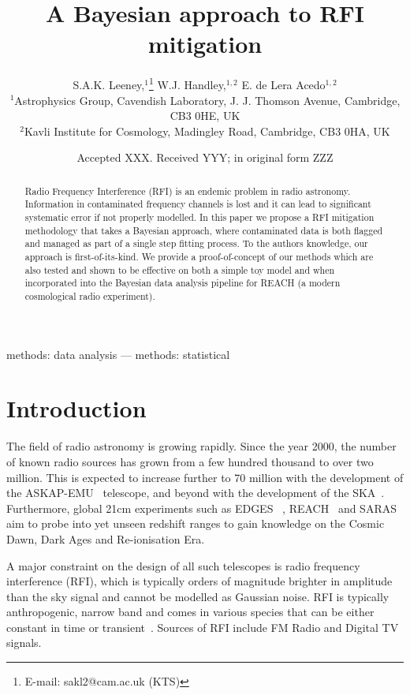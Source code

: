 \documentclass[fleqn,usenatbib]{mnras}
\title[Bayesian Approach to RFI Mitigation]{A Bayesian approach to RFI mitigation}
\author[S.A.K Leeney et al.]{
S.A.K. Leeney,$^{1}$\thanks{E-mail: sakl2@cam.ac.uk (KTS)}
W.J. Handley,$^{1, 2}$
E. de Lera Acedo$^{1, 2}$
\\
$^{1}$Astrophysics Group, Cavendish Laboratory, J. J. Thomson Avenue, Cambridge, CB3 0HE, UK\\
$^{2}$Kavli Institute for Cosmology, Madingley Road, Cambridge, CB3 0HA, UK\\
}
\date{Accepted XXX. Received YYY; in original form ZZZ}
\begin{document}
\label{firstpage}
\pagerange{\pageref{firstpage}--\pageref{lastpage}}
\maketitle

\begin{abstract}
Radio Frequency Interference (RFI) is an endemic problem in radio astronomy. Information in contaminated frequency channels is lost and it can lead to significant systematic error if not properly modelled. In this paper we propose a RFI mitigation methodology that takes a Bayesian approach, where contaminated data is both flagged and managed as part of a single step fitting process. To the authors knowledge, our approach is first-of-its-kind. We provide a proof-of-concept of our methods which are also tested and shown to be effective on both a simple toy model and when incorporated into the Bayesian data analysis pipeline for REACH (a modern cosmological radio experiment). 
\end{abstract}

\begin{keywords}
methods: data analysis — methods: statistical
\end{keywords}



\section{Introduction}
The field of radio astronomy is growing rapidly. Since the year 2000, the number of known radio sources has grown from a few hundred thousand to over two million. This is expected to increase further to 70 million with the development of the ASKAP-EMU~\cite{johnston2008science} telescope, and beyond with the development of the SKA~\cite{bourke2015advancing}. Furthermore, global 21cm experiments such as EDGES ~\cite{bowman2018absorption},  REACH~\cite{de2022reach} and SARAS~\cite{singh2017first} aim to probe into yet unseen redshift ranges to gain knowledge on the Cosmic Dawn, Dark Ages and Re-ionisation Era.

A major constraint on the design of all such telescopes is radio frequency interference (RFI), which is typically orders of magnitude brighter in amplitude than the sky signal and cannot be modelled as Gaussian noise. RFI is typically anthropogenic, narrow band and comes in various species that can be either constant in time or transient~\cite{ellingson2006rfi}. Sources of RFI include FM Radio and Digital TV signals. 
\end{document}
